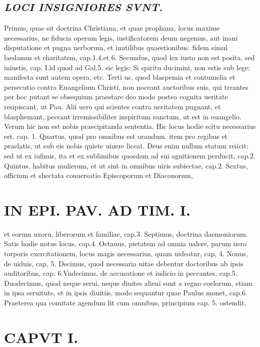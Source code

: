 \documentclass{article}
\begin{document}
\begin{pages}
\subsection*{\textit{LOCI INSIGNIORES SVNT. }}\pstart Primus, quae sit doctrina Christiana, et quae prophana, locus maxime necessarius, ne fiducia operum legis, iustificatorem deum negemus, aut inani disputatione et pugna uerborum, et inutilibus quaestionibus. fidem simul laedamus et charitatem, cap.1.4.et 6. Secundus, quod lex iusto non est posita, sed iniustis, cap. I.id quod ad Gal.5. sic legis: Si spiritu ducimini, non estis sub lege: manifesta sunt autem opera, etc. Terti us, quod blaspemia et contumelia et persecutio contra Euangelium Christi, non noceant auctoribus suis, qui trrantes per hoc putant se obsequium praestare deo modo postea cognita ueritate resipiscant, ut Pau. Alii uero qui scientes contra ueritatem pugnant, et blasphemant, peccant irremissibiliter inspiritum sanctum, ut est in euangelio. Verum hic non est nobis praecipitanda sententia. Hic locus hodie scitu necessarius est. cap. 1. Quartus, quod pro omnibus est orandum. item pro regibus et praelatis, ut sub eis nobis quiete uiuere liceat. Deus enim nullum statum reiicit: sed ut ex iufimis, ita et ex sublimibus quosdam ad sui agnitionem perducit, cap.2. Quintus, habitus mulierum, et ut sint in omnibus uiris subiectae, cap.2. Sextus, officium et shectata conuersatio Episcoporum et Diaconorum,  \pend
\section*{IN EPI. PAV. AD TIM. I. }
\marginpar{[ p.79 ]}\pstart et eorum uxoru, liberorum et familiae, cap.3. Septimus, doctrina daemoniorum. Satis hodie notus locus, cap.4. Octauus, pietatem ad omnia ualere, parum uero torporis exercitationem, locus magis necessarius, quam uideatur, cap, 4. Nonus, de uiduis, cap, 5. Decimus, quod necessaria uitae debentur doctoribus ab ipsis auditoribus, cap. 6.Vndecimus, de accusatione et iudicio in peccantes, cap.5. Duodecimus, quod neque  serui, neque  diuites alieni sunt a regno coelorum, etiam in ipsa seruitute, et in ipsis diuitiis, modo sequantur quae Paulus monet, cap.6. Praeterea qua comitate agendum lit cum omnibus, principium cap. 5. ostendit.  \pend
\section{CAPVT I.}
{}

\end{pages}
\end{document}
